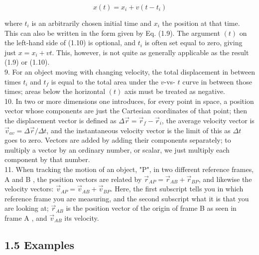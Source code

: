 \documentclass[10pt]{article}
\begin{document}
$$
x(t)=x_{i}+v\left(t-t_{i}\right)
$$

where $t_{i}$ is an arbitrarily chosen initial time and $x_{i}$ the position at that time. This can also be written in the form given by Eq. (1.9). The argument $(t)$ on the left-hand side of (1.10) is optional, and $t_{i}$ is often set equal to zero, giving just $x=x_{i}+v t$. This, however, is not quite as generally applicable as the result (1.9) or (1.10).\\
9. For an object moving with changing velocity, the total displacement in between times $t_{i}$ and $t_{f}$ is equal to the total area under the $v$-vs- $t$ curve in between those times; areas below the horizontal $(t)$ axis must be treated as negative.\\
10. In two or more dimensions one introduces, for every point in space, a position vector whose components are just the Cartesian coordinates of that point; then the displacement vector is defined as $\Delta \vec{r}=\vec{r}_{f}-\vec{r}_{i}$, the average velocity vector is $\vec{v}_{a v}=\Delta \vec{r} / \Delta t$, and the instantaneous velocity vector is the limit of this as $\Delta t$ goes to zero. Vectors are added by adding their components separately; to multiply a vector by an ordinary number, or scalar, we just multiply each component by that number.\\
11. When tracking the motion of an object, "P", in two different reference frames, A and B , the position vectors are related by $\vec{r}_{A P}=\vec{r}_{A B}+\vec{r}_{B P}$, and likewise the velocity vectors: $\vec{v}_{A P}=\vec{v}_{A B}+\vec{v}_{B P}$. Here, the first subscript tells you in which reference frame you are measuring, and the second subscript what it is that you are looking at; $\vec{r}_{A B}$ is the position vector of the origin of frame B as seen in frame A , and $\vec{v}_{A B}$ its velocity.

\subsection*{1.5 Examples}
\end{document}
